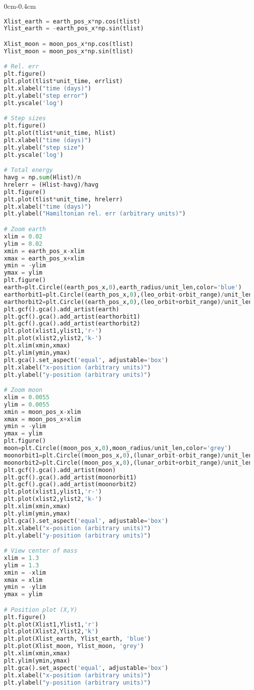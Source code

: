 \begin{adjustwidth*}{0cm}{-0.4cm}
\begin{lstlisting}[language=Python]
Xlist_earth = earth_pos_x*np.cos(tlist)
Ylist_earth = -earth_pos_x*np.sin(tlist)

Xlist_moon = moon_pos_x*np.cos(tlist)
Ylist_moon = moon_pos_x*np.sin(tlist)

# Rel. err
plt.figure()
plt.plot(tlist*unit_time, errlist)
plt.xlabel("time (days)")
plt.ylabel("step error")
plt.yscale('log')

# Step sizes
plt.figure()
plt.plot(tlist*unit_time, hlist)
plt.xlabel("time (days)")
plt.ylabel("step size")
plt.yscale('log')

# Total energy
havg = np.sum(Hlist)/n
hrelerr = (Hlist-havg)/havg
plt.figure()
plt.plot(tlist*unit_time, hrelerr)
plt.xlabel("time (days)")
plt.ylabel("Hamiltonian rel. err (arbitrary units)")

# Zoom earth
xlim = 0.02
ylim = 0.02
xmin = earth_pos_x-xlim
xmax = earth_pos_x+xlim
ymin = -ylim
ymax = ylim
plt.figure()
earth=plt.Circle((earth_pos_x,0),earth_radius/unit_len,color='blue')
earthorbit1=plt.Circle((earth_pos_x,0),(leo_orbit-orbit_range)/unit_len,color='g',fill=False)
earthorbit2=plt.Circle((earth_pos_x,0),(leo_orbit+orbit_range)/unit_len,color='g',fill=False)
plt.gcf().gca().add_artist(earth)
plt.gcf().gca().add_artist(earthorbit1)
plt.gcf().gca().add_artist(earthorbit2)
plt.plot(xlist1,ylist1,'r-')
plt.plot(xlist2,ylist2,'k-')
plt.xlim(xmin,xmax)
plt.ylim(ymin,ymax)
plt.gca().set_aspect('equal', adjustable='box')
plt.xlabel("x-position (arbitrary units)")
plt.ylabel("y-position (arbitrary units)")

# Zoom moon
xlim = 0.0055
ylim = 0.0055
xmin = moon_pos_x-xlim
xmax = moon_pos_x+xlim
ymin = -ylim
ymax = ylim
plt.figure()
moon=plt.Circle((moon_pos_x,0),moon_radius/unit_len,color='grey')
moonorbit1=plt.Circle((moon_pos_x,0),(lunar_orbit-orbit_range)/unit_len,color='g',fill=False)
moonorbit2=plt.Circle((moon_pos_x,0),(lunar_orbit+orbit_range)/unit_len,color='g',fill=False)
plt.gcf().gca().add_artist(moon)
plt.gcf().gca().add_artist(moonorbit1)
plt.gcf().gca().add_artist(moonorbit2)
plt.plot(xlist1,ylist1,'r-')
plt.plot(xlist2,ylist2,'k-')
plt.xlim(xmin,xmax)
plt.ylim(ymin,ymax)
plt.gca().set_aspect('equal', adjustable='box')
plt.xlabel("x-position (arbitrary units)")
plt.ylabel("y-position (arbitrary units)")

# View center of mass
xlim = 1.3
ylim = 1.3
xmin = -xlim
xmax = xlim
ymin = -ylim
ymax = ylim

# Position plot (X,Y)
plt.figure()
plt.plot(Xlist1,Ylist1,'r')
plt.plot(Xlist2,Ylist2,'k')
plt.plot(Xlist_earth, Ylist_earth, 'blue')
plt.plot(Xlist_moon, Ylist_moon, 'grey')
plt.xlim(xmin,xmax)
plt.ylim(ymin,ymax)
plt.gca().set_aspect('equal', adjustable='box')
plt.xlabel("x-position (arbitrary units)")
plt.ylabel("y-position (arbitrary units)")


\end{lstlisting}
\end{adjustwidth*}
